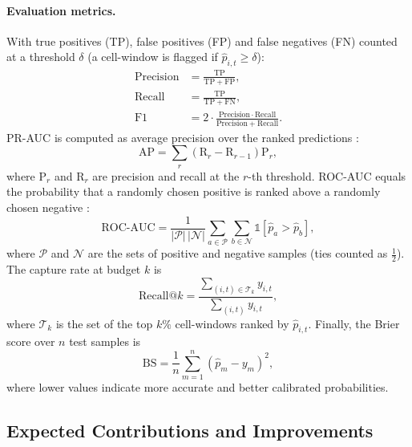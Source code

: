 \paragraph{Evaluation metrics.}
With true positives (TP), false positives (FP) and false negatives (FN) counted at a threshold $\delta$ (a cell-window is flagged if $\hat{p}_{i,t} \geq \delta$):
\begin{align}
\mathrm{Precision} &= \frac{\mathrm{TP}}{\mathrm{TP}+\mathrm{FP}}, \label{eq:precision}\\
\mathrm{Recall} &= \frac{\mathrm{TP}}{\mathrm{TP}+\mathrm{FN}}, \label{eq:recall}\\
\mathrm{F1} &= 2\cdot\frac{\mathrm{Precision}\cdot\mathrm{Recall}}{\mathrm{Precision}+\mathrm{Recall}}. \label{eq:f1}
\end{align}
PR-AUC is computed as average precision over the ranked predictions \cite{davis2006relationship}:
\begin{equation}
\mathrm{AP} = \sum_{r} \left(\mathrm{R}_r - \mathrm{R}_{r-1}\right) \mathrm{P}_r,
\label{eq:ap}
\end{equation}
where $\mathrm{P}_r$ and $\mathrm{R}_r$ are precision and recall at the $r$-th threshold. ROC-AUC equals the probability that a randomly chosen positive is ranked above a randomly chosen negative \cite{fawcett2006introduction}:
\begin{equation}
\mathrm{ROC\text{-}AUC} = \frac{1}{|\mathcal{P}|\,|\mathcal{N}|} \sum_{a \in \mathcal{P}} \sum_{b \in \mathcal{N}} \mathbb{1}\left[\hat{p}_a > \hat{p}_b\right],
\label{eq:rocauc}
\end{equation}
where $\mathcal{P}$ and $\mathcal{N}$ are the sets of positive and negative samples (ties counted as $\tfrac{1}{2}$). The capture rate at budget $k$ is
\begin{equation}
\mathrm{Recall@}k = \frac{\sum_{(i,t) \in \mathcal{T}_k} y_{i,t}}{\sum_{(i,t)} y_{i,t}},
\label{eq:recallk}
\end{equation}
where $\mathcal{T}_k$ is the set of the top $k\%$ cell-windows ranked by $\hat{p}_{i,t}$. Finally, the Brier score over $n$ test samples is \cite{brier1950verification}
\begin{equation}
\mathrm{BS} = \frac{1}{n}\sum_{m=1}^{n} \left(\hat{p}_m - y_m\right)^2,
\label{eq:brier}
\end{equation}
where lower values indicate more accurate and better calibrated probabilities.

\subsection{Expected Contributions and Improvements}
\label{sec:contributions}

